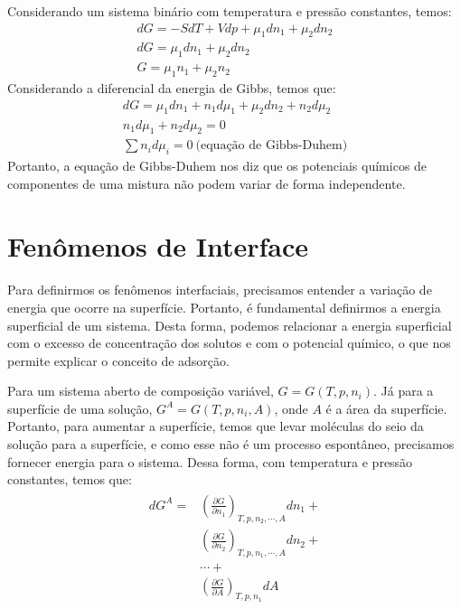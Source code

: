 \begin{multicols*}{2}
  \begin{definition}
    Considerando um sistema binário com temperatura e pressão constantes, temos:
    \begin{gather}
      dG = -SdT + Vdp + \mu_1 dn_1 + \mu_2 dn_2 \\
      dG = \mu_1 dn_1 + \mu_2 dn_2 \\
      G = \mu_1 n_1 + \mu_2 n_2
    \end{gather}
    Considerando a diferencial da energia de Gibbs, temos que:
    \begin{gather}
      dG = \mu_1 dn_1 + n_1 d\mu_1 + \mu_2 dn_2 + n_2 d\mu_2 \\
      n_1 d\mu_1 + n_2 d\mu_2 = 0 \\
      \sum n_i d\mu_i = 0 \ \text{(equação de Gibbs-Duhem)}
    \end{gather}
    Portanto, a equação de Gibbs-Duhem nos diz que os potenciais químicos de componentes de uma mistura não podem variar de forma independente.
  \end{definition}

  \section*{Fenômenos de Interface}

  \paragraph{ } Para definirmos os fenômenos interfaciais, precisamos entender a variação de energia que ocorre na superfície. Portanto, é fundamental definirmos a energia superficial de um sistema. Desta forma, podemos relacionar a energia superficial com o excesso de concentração dos solutos e com o potencial químico, o que nos permite explicar o conceito de adsorção.

  \begin{definition}
    Para um sistema aberto de composição variável, $G = G(T,p,n_i)$. Já para a superfície de uma solução, $G^{A}=G(T,p,n_i,A)$, onde $A$ é a área da superfície. Portanto, para aumentar a superfície, temos que levar moléculas do seio da solução para a superfície, e como esse não é um processo espontâneo, precisamos fornecer energia para o sistema. Dessa forma, com temperatura e pressão constantes, temos que:
    \begin{gather}
      \begin{align}
        dG^{A} = & \left( \frac{\partial G}{\partial n_1}  \right)_{T,p,n_2, \cdots,A} dn_1 + \\
               & \left( \frac{\partial G}{\partial n_2}  \right)_{T,p,n_1,\cdots,A} dn_2 + \\
               & \cdots + \\
               & \left( \frac{\partial G}{\partial A} \right)_{T,p,n_1} dA
      \end{align}
    \end{gather}


\end{definition}
\end{multicols*}
